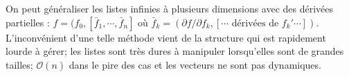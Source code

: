 On peut g\'en\'eraliser les listes infinies \`a plusieurs dimensions avec des d\'eriv\'ees partielles :
$f=(f_0,[\bar f_1,\cdots, \bar f_n] $ o\`u $\bar f_k=(\partial f/\partial f_k,[\cdots \text{ d\'eriv\'ees de }f_k' \cdots])$.
L'inconv\'enient d'une telle m\'ethode vient de la structure qui est rapidement lourde \`a g\'erer; les listes sont tr\`es dures
\`a manipuler lorsqu'elles sont de grandes tailles; $\mathcal{O}(n)$ dans le pire des cas et les vecteurs ne sont pas dynamiques.\\



